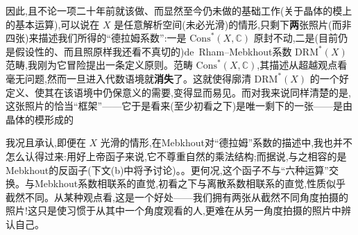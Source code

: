 \noindent 因此,且不论一项二十年前就该做、而显然至今仍未做的基础工作(关于晶体的模上的基本运算),可以说在 $X$ 是任意解析空间(未必光滑)的情形,只剩下\textbf{两}张照片(而非四张)来描述我们所得的“德拉姆系数”:一是 $\mathrm{Cons}^{*}(X,\mathbb{C})$ 原封不动,二是(目前仍是假设性的、而且照原样我还看不真切的)de~Rham--Mebkhout系数 $\mathrm{DRM}^{*}(X)$ 范畴,我刚为它冒险提出一条定义原则。范畴 $\mathrm{Cons}^{*}(X,\mathbb{C})$,其描述从超越观点看毫无问题,然而一旦进入代数语境就\textbf{消失}了。这就使得廓清 $\mathrm{DRM}^{*}(X)$ 的一个好定义、使其在该语境中仍保意义的需要,变得显而易见。而对我来说同样清楚的是,这张照片的恰当“框架”——它于是看来(至少初看之下)是唯一剩下的一张——是由晶体的模形成的

\noindent 我况且承认,即便在 $X$ 光滑的情形,在Mebkhout对“德拉姆”系数的描述中,我也并不怎么认得过来:用好上帝函子来说,它不尊重自然的乘法结构;而据说,与之相容的是Mebkhout的反函子(下文(b)中将予讨论)。。更何况,这个函子不与“六种运算”交换。与Mebkhout系数相联系的直觉\dmark{},初看之下与离散系数相联系的直觉,性质似乎截然不同。从某种观点看,这是一个好处——我们拥有两张从截然不同角度拍摄的照片!这只是使习惯于从其中一个角度观看的人,更难在从另一角度拍摄的照片中辨认自己。

